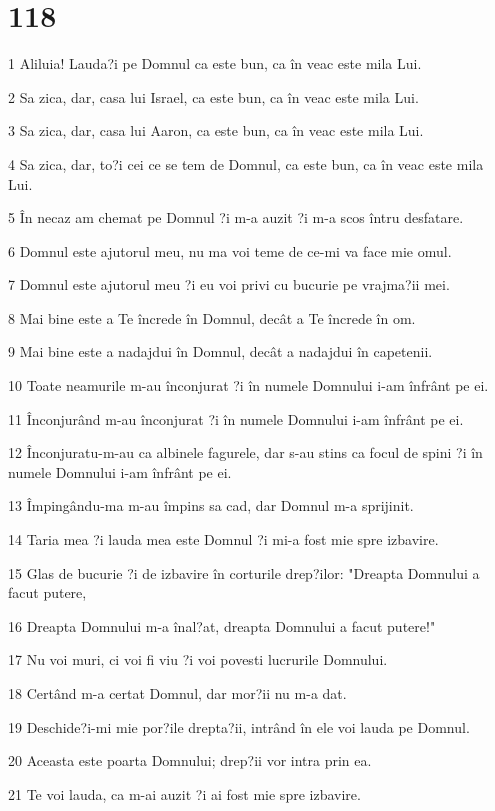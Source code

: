 \chapter{118}

\par 1 Aliluia! Lauda?i pe Domnul ca este bun, ca în veac este mila Lui.
\par 2 Sa zica, dar, casa lui Israel, ca este bun, ca în veac este mila Lui.
\par 3 Sa zica, dar, casa lui Aaron, ca este bun, ca în veac este mila Lui.
\par 4 Sa zica, dar, to?i cei ce se tem de Domnul, ca este bun, ca în veac este mila Lui.
\par 5 În necaz am chemat pe Domnul ?i m-a auzit ?i m-a scos întru desfatare.
\par 6 Domnul este ajutorul meu, nu ma voi teme de ce-mi va face mie omul.
\par 7 Domnul este ajutorul meu ?i eu voi privi cu bucurie pe vrajma?ii mei.
\par 8 Mai bine este a Te încrede în Domnul, decât a Te încrede în om.
\par 9 Mai bine este a nadajdui în Domnul, decât a nadajdui în capetenii.
\par 10 Toate neamurile m-au înconjurat ?i în numele Domnului i-am înfrânt pe ei.
\par 11 Înconjurând m-au înconjurat ?i în numele Domnului i-am înfrânt pe ei.
\par 12 Înconjuratu-m-au ca albinele fagurele, dar s-au stins ca focul de spini ?i în numele Domnului i-am înfrânt pe ei.
\par 13 Împingându-ma m-au împins sa cad, dar Domnul m-a sprijinit.
\par 14 Taria mea ?i lauda mea este Domnul ?i mi-a fost mie spre izbavire.
\par 15 Glas de bucurie ?i de izbavire în corturile drep?ilor: "Dreapta Domnului a facut putere,
\par 16 Dreapta Domnului m-a înal?at, dreapta Domnului a facut putere!"
\par 17 Nu voi muri, ci voi fi viu ?i voi povesti lucrurile Domnului.
\par 18 Certând m-a certat Domnul, dar mor?ii nu m-a dat.
\par 19 Deschide?i-mi mie por?ile drepta?ii, intrând în ele voi lauda pe Domnul.
\par 20 Aceasta este poarta Domnului; drep?ii vor intra prin ea.
\par 21 Te voi lauda, ca m-ai auzit ?i ai fost mie spre izbavire.

